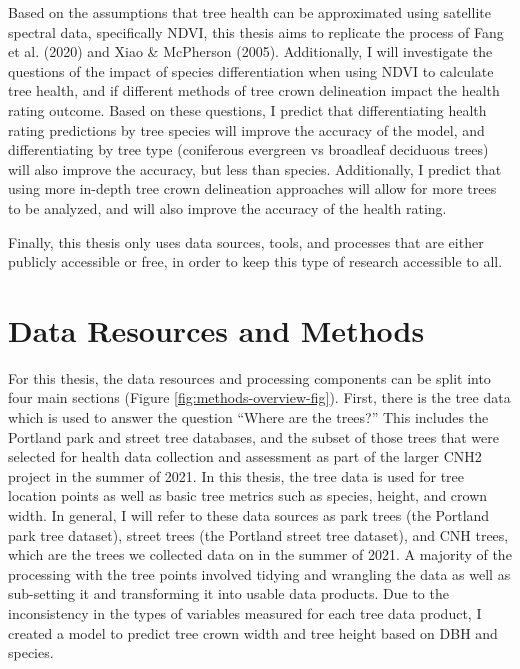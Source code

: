 \documentclass[12pt,twoside]{reedthesis}
\begin{document}
Based on the assumptions that tree health can be approximated using
satellite spectral data, specifically NDVI, this thesis aims to
replicate the process of Fang et al. (2020) and Xiao \& McPherson (2005). Additionally, I will
investigate the questions of the impact of species differentiation when
using NDVI to calculate tree health, and if different methods of tree
crown delineation impact the health rating outcome. Based on these
questions, I predict that differentiating health rating predictions by
tree species will improve the accuracy of the model, and differentiating
by tree type (coniferous evergreen vs broadleaf deciduous trees) will
also improve the accuracy, but less than species. Additionally, I
predict that using more in-depth tree crown delineation approaches will
allow for more trees to be analyzed, and will also improve the accuracy
of the health rating.

Finally, this thesis only uses data sources, tools, and processes that
are either publicly accessible or free, in order to keep this type of
research accessible to all.

\hypertarget{data-methods}{%
\chapter{Data Resources and Methods}\label{data-methods}}

For this thesis, the data resources and processing components can be
split into four main sections (Figure \ref{fig:methods-overview-fig}).
First, there is the tree data which is used to answer the question
``Where are the trees?'' This includes the Portland park and street tree
databases, and the subset of those trees that were selected for health
data collection and assessment as part of the larger CNH2 project in the
summer of 2021. In this thesis, the tree data is used for tree location
points as well as basic tree metrics such as species, height, and crown
width. In general, I will refer to these data sources as park trees (the
Portland park tree dataset), street trees (the Portland street tree
dataset), and CNH trees, which are the trees we collected data on in the
summer of 2021. A majority of the processing with the tree points
involved tidying and wrangling the data as well as sub-setting it and
transforming it into usable data products. Due to the inconsistency in
the types of variables measured for each tree data product, I created a
model to predict tree crown width and tree height based on DBH and
species.
\end{document}
